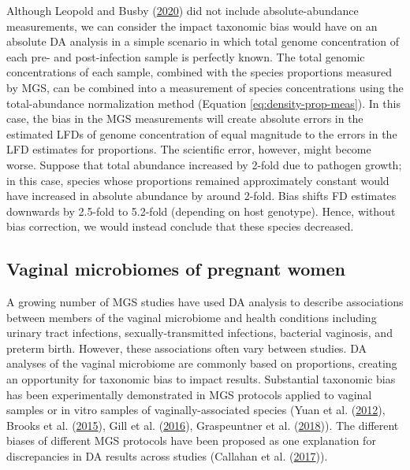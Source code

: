 \documentclass[
]{article}
\begin{document}
Although Leopold and Busby (\protect\hyperlink{ref-leopold2020host}{2020}) did not include absolute-abundance measurements, we can consider the impact taxonomic bias would have on an absolute DA analysis in a simple scenario in which total genome concentration of each pre- and post-infection sample is perfectly known.
The total genomic concentrations of each sample, combined with the species proportions measured by MGS, can be combined into a measurement of species concentrations using the total-abundance normalization method (Equation \eqref{eq:density-prop-meas}).
In this case, the bias in the MGS measurements will create absolute errors in the estimated LFDs of genome concentration of equal magnitude to the errors in the LFD estimates for proportions.
The scientific error, however, might become worse.
Suppose that total abundance increased by 2-fold due to pathogen growth; in this case, species whose proportions remained approximately constant would have increased in absolute abundance by around 2-fold.
Bias shifts FD estimates downwards by 2.5-fold to 5.2-fold (depending on host genotype).
Hence, without bias correction, we would instead conclude that these species decreased.

\hypertarget{vaginal-microbiomes-of-pregnant-women}{%
\subsection{Vaginal microbiomes of pregnant women}\label{vaginal-microbiomes-of-pregnant-women}}

A growing number of MGS studies have used DA analysis to describe associations between members of the vaginal microbiome and health conditions including urinary tract infections, sexually-transmitted infections, bacterial vaginosis, and preterm birth.
However, these associations often vary between studies.
DA analyses of the vaginal microbiome are commonly based on proportions, creating an opportunity for taxonomic bias to impact results.
Substantial taxonomic bias has been experimentally demonstrated in MGS protocols applied to vaginal samples or in vitro samples of vaginally-associated species (Yuan et al. (\protect\hyperlink{ref-yuan2012eval}{2012}), Brooks et al. (\protect\hyperlink{ref-brooks2015thet}{2015}), Gill et al. (\protect\hyperlink{ref-gill2016eval}{2016}), Graspeuntner et al. (\protect\hyperlink{ref-graspeuntner2018sele}{2018})).
The different biases of different MGS protocols have been proposed as one explanation for discrepancies in DA results across studies (Callahan et al. (\protect\hyperlink{ref-callahan2017repl}{2017})).
\end{document}
